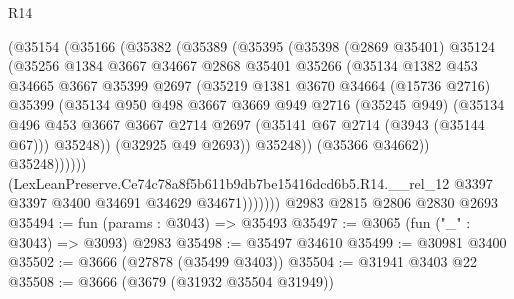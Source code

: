 \begin{lexlean}{R14}
\begin{coremodule}
                  (@35154
                    (@35166
                      (@35382
                        (@35389
                          (@35395
                            (@35398
                              (@2869 @35401)
                              @35124
                              (@35256
                                @1384
                                @3667
                                @34667
                                @2868
                                @35401
                                @35266
                                (@35134
                                  @1382
                                  @453
                                  @34665
                                  @3667
                                  @35399
                                  @2697
                                  (@35219
                                    @1381
                                    @3670
                                    @34664
                                    (@15736 @2716)
                                    @35399
                                    (@35134
                                      @950
                                      @498
                                      @3667
                                      @3669
                                      @949
                                      @2716
                                      (@35245 @949)
                                      (@35134
                                        @496
                                        @453
                                        @3667
                                        @3667
                                        @2714
                                        @2697
                                        (@35141 @67 @2714 (@3943 (@35144 @67)))
                                        @35248))
                                    (@32925 @49 @2693))
                                  @35248))
                              (@35366 @34662))
                            @35248))))))
                (LexLeanPreserve.Ce74c78a8f5b611b9db7be15416dcd6b5.R14.__rel_12
                  @3397
                  @3397
                  @3400
                  @34691
                  @34629
                  @34671)))))))
    @2983
    @2815
    @2806
    @2830
    @2693
@35494 := fun (params : @3043) => @35493
@35497 := @3065 (fun ("_" : @3043) => @3093) @2983
@35498 := @35497 @34610
@35499 := @30981 @3400
@35502 := @3666 (@27878 (@35499 @3403))
@35504 := @31941 @3403 @22
@35508 := @3666 (@3679 (@31932 @35504 @31949))

\end{coremodule}
\end{lexlean}
